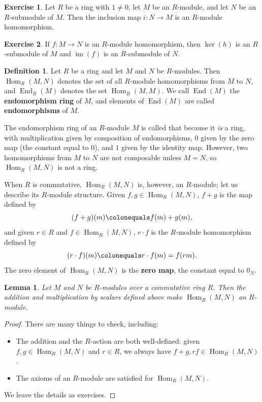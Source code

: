 \documentclass[12pt]{report}
\newtheorem{lemma}[theorem]{Lemma}
\numberwithin{equation}{section}
\numberwithin{theorem}{chapter}
\theoremstyle{definition}
\newtheorem{definition}[theorem]{Definition}
\newtheorem{exercise}{Exercise}
\newtheorem*{basic properties}{Basic Properties}
\newtheorem*{Important Remark}{Important Remark}
\newcommand{\df}[1]{{\bf #1}\index{#1}}
\renewcommand{\ker}{\operatorname{ker}}
\DeclareMathOperator{\im}{im}
\DeclareMathOperator{\End}{End}
\DeclareMathOperator{\Hom}{Hom}
\begin{document}
 
\begin{exercise}
Let $R$ be a ring with $1 \neq  0$, let $M$ be an $R$-module, and let $N$ be an $R$-submodule of $M$. Then the inclusion map $i\!: N \to M$ is an $R$-module homomorphism. 
\end{exercise}



\begin{exercise}
If $f\!: M \to N$ is an $R$-module homomorphism, then $\ker(h)$ is an $R$-submodule of $M$ and $\im(f)$ is an $R$-submodule of $N$.
\end{exercise}





\begin{definition}
Let $R$ be a ring and let $M$ and $N$ be $R$-modules. Then $\Hom_R(M,N)$ denotes the set of all $R$-module homomorphisms from $M$ to $N$, and $\End_R(M)$ denotes the set $\Hom_R(M,M)$. We call $\End(M)$ the \df{endomorphism ring} of $M$, and elements of $\End(M)$ are called \df{endomorphisms} of $M$.
\end{definition}

The endomorphism ring of an $R$-module $M$ is called that because it \emph{is} a ring, with multiplication given by composition of endomorphisms, $0$ given by the zero map (the constant equal to $0$), and $1$ given by the identity map. 
However, two homomorphisms from $M$ to $N$ are not composable unless $M = N$, so $\Hom_R(M,N)$ is not a ring. 

When $R$ is commutative, $\Hom_R(M,N)$ is, however, an $R$-module; let us describe its $R$-module structure.
	Given $f, g \in \Hom_R(M,N)$, $f+g$ is the map defined by
	$$(f+g)(m) \colonequals f(m) + g(m),$$ 
	and given $r \in R$ and $f \in \Hom_R(M,N)$, $r \cdot f$ is the $R$-module homomorphism defined by
	$$(r \cdot f) (m) \colonequals r \cdot f(m) = f(rm).$$
	The zero element of $\Hom_R(M,N)$ is the {\bf zero map}, the constant equal to $0_N$.

\begin{lemma}\label{Hom is an Rmod}
	Let $M$ and $N$ be $R$-modules over a commutative ring $R$. Then the addition and multiplication by scalars defined above make $\Hom_R(M,N)$ an $R$-module.
\end{lemma}

\begin{proof}
There are many things to check, including:
\begin{itemize}
\item The addition and the $R$-action are both well-defined: given $f,g\in \Hom_R(M,N)$ and $r\in R$, we always have $f+g, rf\in \Hom_R(M,N)$.
\item The axioms of an $R$-module are satisfied for $\Hom_R(M,N)$.
\end{itemize}
 We leave the details as exercises.
\end{proof}
\end{document}
